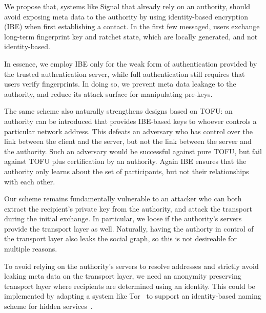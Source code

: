 \documentclass[twoside,letterpaper]{sig-alternate}
\begin{document}

\smallskip

We propose that, systems like Signal that already rely on an authority,
should avoid exposing meta data to the authority by using
identity-based encryption (IBE) when first establishing a contact.
In the first few messaged, users exchange long-term fingerprint key and
ratchet state, which are locally generated, and not identity-based.

In essence, we employ IBE only for the weak form of authentication provided
by the trusted authentication server,
while full authentication still requires that users verify fingerprints.
In doing so, we prevent meta data leakage to the authority, and reduce
its attack surface for manipulating pre-keys.

The same scheme also naturally strengthens designs based on TOFU:
an authority can be introduced that provides IBE-based keys to
whoever controls a particular network address.  This defeats an
adversary who has control over the link between the client and the
server, but not the link between the server and the authority.
Such an adversary would be successful against pure TOFU, but fail
against TOFU plus certification by an authority.  Again IBE ensures
that the authority only learns about the set of participants, but
not their relationships with each other.

Our scheme remains fundamentally vulnerable to an attacker who can both
extract the recipient's private key from the authority, and
attack the transport during the initial exchange.
In particular, we loose if the authority's servers provide the transport
layer as well.  Naturally, having the authorty in control of the
transport layer also leaks the social graph, so this is not desireable
for multiple reasons.

To avoid relying on the authority's servers to resolve addresses and
strictly avoid leaking meta data on the transport layer, we need an
anonymity preserving transport layer where recipients are determined
using an identity.  This could be implemented by adapting a system
like Tor~\cite{tor} to support an identity-based naming scheme
for hidden services~\cite{hidden}.
\end{document}

